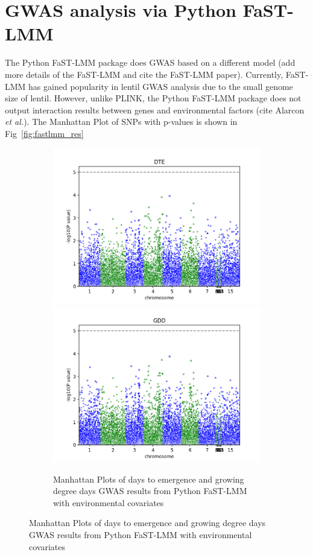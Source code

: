 \documentclass{article}
\begin{document}
\bigskip

\section*{GWAS analysis via Python FaST-LMM}
The Python FaST-LMM package does GWAS based on a different model (add more details of the FaST-LMM and cite the FaST-LMM paper). Currently, FaST-LMM has gained popularity in lentil GWAS analysis due to the small genome size of lentil. However, unlike PLINK, the Python FaST-LMM package does not output interaction results between genes and environmental factors (cite Alarcon \emph{et al.}). The Manhattan Plot of SNPs with p-values is shown in Fig~\ref{fig:fastlmm_res}

\begin{figure}[!htb]
 \centering
 \begin{subfigure}[normla]{\textwidth}
  \centering
  	\includegraphics[scale=0.45]{FaST_LMM_DTE.png}
	\includegraphics[scale=0.45]{FaST_LMM_GDD.png}
 	 \caption{Manhattan Plots of days to emergence and growing degree days GWAS results from Python FaST-LMM with environmental covariates}
 	 \label{fig:subfig1}
 \end{subfigure}
 

\end{figure}
\end{document}
